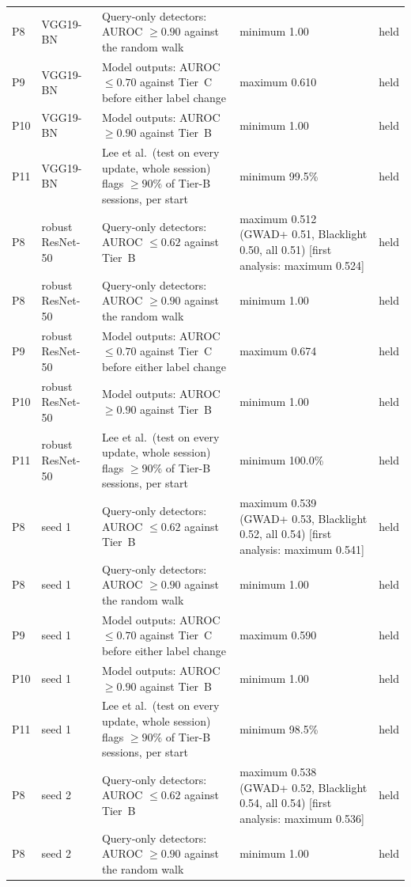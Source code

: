 \begin{footnotesize}
\begin{longtable}{L{0.9cm}L{1.9cm}L{5.0cm}L{3.4cm}L{1.1cm}}
P8 & VGG19-BN & Query-only detectors: AUROC $\ge0.90$ against the random walk & minimum 1.00 & held \\
P9 & VGG19-BN & Model outputs: AUROC $\le0.70$ against Tier~C before either label change & maximum 0.610 & held \\
P10 & VGG19-BN & Model outputs: AUROC $\ge0.90$ against Tier~B & minimum 1.00 & held \\
P11 & VGG19-BN & Lee et al.\ (test on every update, whole session) flags $\ge90\%$ of Tier-B sessions, per start & minimum 99.5\% & held \\
P8 & robust ResNet-50 & Query-only detectors: AUROC $\le0.62$ against Tier~B & maximum 0.512 (GWAD+ 0.51, Blacklight 0.50, all 0.51) [first analysis: maximum 0.524] & held \\
P8 & robust ResNet-50 & Query-only detectors: AUROC $\ge0.90$ against the random walk & minimum 1.00 & held \\
P9 & robust ResNet-50 & Model outputs: AUROC $\le0.70$ against Tier~C before either label change & maximum 0.674 & held \\
P10 & robust ResNet-50 & Model outputs: AUROC $\ge0.90$ against Tier~B & minimum 1.00 & held \\
P11 & robust ResNet-50 & Lee et al.\ (test on every update, whole session) flags $\ge90\%$ of Tier-B sessions, per start & minimum 100.0\% & held \\
P8 & seed 1 & Query-only detectors: AUROC $\le0.62$ against Tier~B & maximum 0.539 (GWAD+ 0.53, Blacklight 0.52, all 0.54) [first analysis: maximum 0.541] & held \\
P8 & seed 1 & Query-only detectors: AUROC $\ge0.90$ against the random walk & minimum 1.00 & held \\
P9 & seed 1 & Model outputs: AUROC $\le0.70$ against Tier~C before either label change & maximum 0.590 & held \\
P10 & seed 1 & Model outputs: AUROC $\ge0.90$ against Tier~B & minimum 1.00 & held \\
P11 & seed 1 & Lee et al.\ (test on every update, whole session) flags $\ge90\%$ of Tier-B sessions, per start & minimum 98.5\% & held \\
P8 & seed 2 & Query-only detectors: AUROC $\le0.62$ against Tier~B & maximum 0.538 (GWAD+ 0.52, Blacklight 0.54, all 0.54) [first analysis: maximum 0.536] & held \\
P8 & seed 2 & Query-only detectors: AUROC $\ge0.90$ against the random walk & minimum 1.00 & held \\

\end{longtable}
\end{footnotesize}
